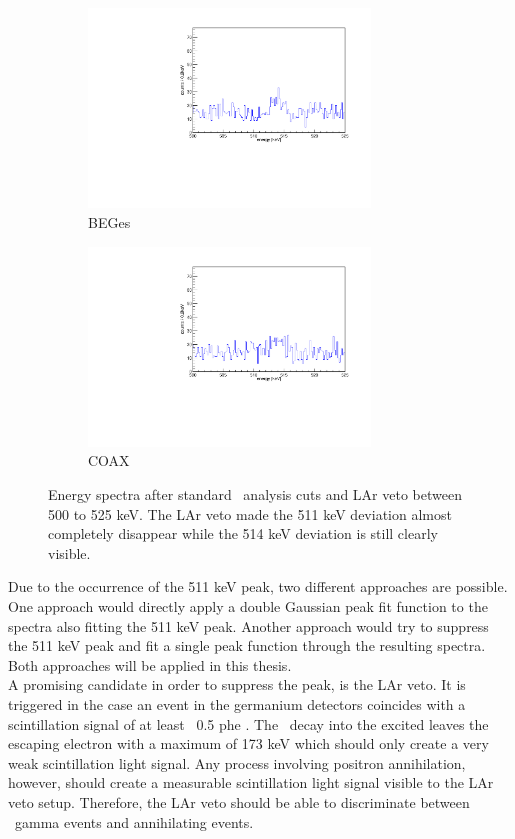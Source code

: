 \documentclass[encoding=utf8,british]{tumphthesis}
\begin{document}
\begin{figure}[t!]
\centering
\begin{subfigure}{0.475\textwidth}
	\includegraphics[width=75mm]{./Bilder/500525LArVetoBEGes.pdf}
    \caption{BEGes}
  \label{fig:LArBEGes}
\end{subfigure}\hfill%
\begin{subfigure}{0.475\textwidth}
	\includegraphics[width=75mm]{./Bilder/500525LArVetoCOAX.pdf}
  \caption{COAX}
  \label{fig:LArCOAX}
\end{subfigure}
    \caption{
    Energy spectra after standard \gerda\ analysis cuts and LAr veto between 500 to 525 keV. 
    The LAr veto made the 511 keV deviation almost completely disappear while the 514 keV deviation is still clearly visible. 
    }
\end{figure}

Due to the occurrence of the 511 keV peak, two different approaches are possible.
One approach would directly apply a double Gaussian peak fit function to the spectra also fitting the 511 keV peak.
Another approach would try to suppress the 511 keV peak and fit a single peak function through the resulting spectra.
Both approaches will be applied in this thesis.
\\

A promising candidate in order to suppress the peak, is the LAr veto.
It is triggered in the case an event in the germanium detectors coincides with a scintillation signal of at least ~0.5 phe \cite{agostini_background_2017}.
The \Kr\ decay into the excited  leaves the escaping electron with a maximum of 173 keV which should only create a very weak scintillation light signal.
Any process involving positron annihilation, however, should create a measurable scintillation light signal visible to the LAr veto setup.
Therefore, the LAr veto should be able to discriminate between \Kr\ gamma events and annihilating events.
\\
\end{document}
